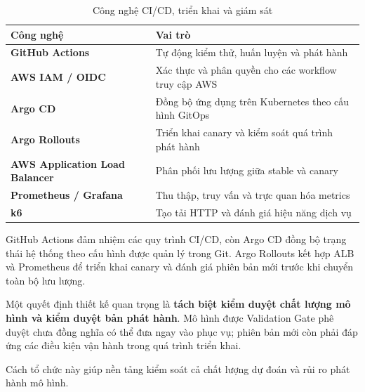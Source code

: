 \begin{table}[!htbp]\centering
\fontsize{12}{15}\selectfont{}
\setlength{\tabcolsep}{4pt}\setlength{\arrayrulewidth}{0.4pt}\renewcommand{\arraystretch}{1.2}
\setlength{\ReportTableWidth}{\dimexpr\linewidth-3\arrayrulewidth\relax}
\begin{tabular}{|L{\tabcolsep\relax}|L{\tabcolsep\relax}|}
\hline
\textbf{Công nghệ} & \textbf{Vai trò} \\
\hline
\textbf{GitHub Actions} & Tự động kiểm thử, huấn luyện và phát hành \\\hline
\textbf{AWS IAM / OIDC} & Xác thực và phân quyền cho các workflow truy cập AWS \\\hline
\textbf{Argo CD} & Đồng bộ ứng dụng trên Kubernetes theo cấu hình GitOps \\\hline
\textbf{Argo Rollouts} & Triển khai canary và kiểm soát quá trình phát hành \\\hline
\textbf{AWS Application Load Balancer} & Phân phối lưu lượng giữa stable và canary \\\hline
\textbf{Prometheus / Grafana} & Thu thập, truy vấn và trực quan hóa metrics \\\hline
\textbf{k6} & Tạo tải HTTP và đánh giá hiệu năng dịch vụ \\\hline
\end{tabular}
\caption{Công nghệ CI/CD, triển khai và giám sát}\label{tab:05}
\end{table}

GitHub Actions đảm nhiệm các quy trình CI/CD, còn Argo CD đồng bộ trạng thái hệ thống theo cấu hình được quản lý trong Git. Argo Rollouts kết hợp ALB và Prometheus để triển khai canary và đánh giá phiên bản mới trước khi chuyển toàn bộ lưu lượng.


Một quyết định thiết kế quan trọng là \textbf{tách biệt kiểm duyệt chất lượng mô hình và kiểm duyệt bản phát hành}. Mô hình được Validation Gate phê duyệt chưa đồng nghĩa có thể đưa ngay vào phục vụ; phiên bản mới còn phải đáp ứng các điều kiện vận hành trong quá trình triển khai.


Cách tổ chức này giúp nền tảng kiểm soát cả chất lượng dự đoán và rủi ro phát hành mô hình.

